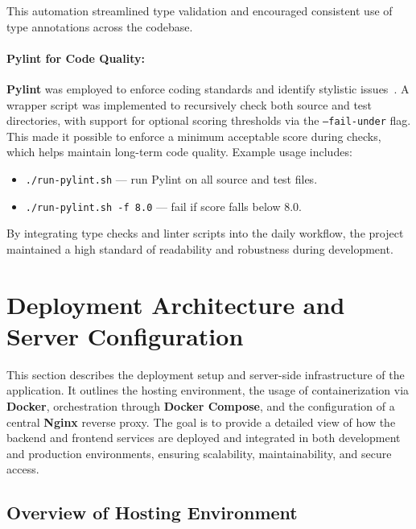 This automation streamlined type validation and encouraged consistent use of type annotations across the codebase.

\paragraph{Pylint for Code Quality:}
\textbf{Pylint} was employed to enforce coding standards and identify stylistic issues~\cite{pylint}. A wrapper script was implemented to recursively check both source and test directories, with support for optional scoring thresholds via the \texttt{--fail-under} flag. This made it possible to enforce a minimum acceptable score during checks, which helps maintain long-term code quality. Example usage includes:

\begin{itemize}
  \item \texttt{./run-pylint.sh} — run Pylint on all source and test files.
  \item \texttt{./run-pylint.sh -f 8.0} — fail if score falls below 8.0.
\end{itemize}

By integrating type checks and linter scripts into the daily workflow, the project maintained a high standard of readability and robustness during development.

\section{Deployment Architecture and Server Configuration}

This section describes the deployment setup and server-side infrastructure of the application. It outlines the hosting environment, the usage of containerization via \textbf{Docker}, orchestration through \textbf{Docker Compose}, and the configuration of a central \textbf{Nginx} reverse proxy. The goal is to provide a detailed view of how the backend and frontend services are deployed and integrated in both development and production environments, ensuring scalability, maintainability, and secure access.

\subsection{Overview of Hosting Environment}

